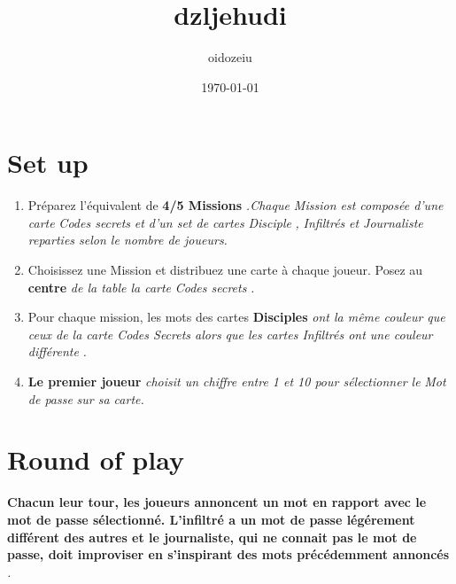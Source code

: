 \documentclass{article}%
\title{dzljehudi}%
\author{oidozeiu}%
\date{\today}%
\begin{document}
%
\pagestyle{empty}%
\normalsize%
\maketitle%
\section{ Set up
}%
\label{sec:Setup}%
\begin{enumerate}%
\item%
%
 Préparez l'équivalent de %
\textbf{4/5 Missions}%
\textit{.Chaque Mission est composée d'une carte }%
\textit{Codes secrets}%
\textit{ et d'un set de cartes }%
\textit{Disciple}%
\textit{,}%
\textit{ Infiltrés}%
\textit{ et Journaliste reparties selon le nombre de joueurs.
}%
\item%
%
 Choisissez une Mission et distribuez une carte à chaque joueur. Posez au %
\textbf{centre}%
\textit{ de la table la carte }%
\textit{Codes secrets}%
\textit{.
}%
\item%
%
 Pour chaque mission, les mots des cartes %
\textbf{Disciples}%
\textit{ ont la même couleur que ceux de la carte Codes Secrets alors que les cartes Infiltrés ont une couleur }%
\textit{différente}%
\textit{.
}%
\item%
%
\textbf{Le premier joueur}%
\textit{ choisit un chiffre entre 1 et 10 pour sélectionner le }%
\textit{Mot de passe}%
\textit{ sur sa carte.
}%
\end{enumerate}

%
\section{ Round of play
}%
\label{sec:Roundofplay}%
\textbf{Chacun leur tour, les joueurs annoncent un mot en rapport avec le mot de passe sélectionné. L'infiltré a un mot de passe légérement différent des autres et le journaliste, qui ne connait pas le mot de passe, doit improviser en s'inspirant des mots précédemment annoncés}%
\textit{.
}

%
\end{document}
